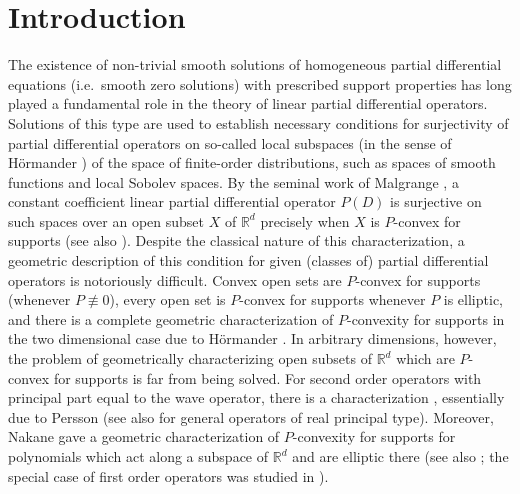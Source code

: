 \documentclass[a4paper,10pt]{amsart}
\newtheorem*{crucial lemma}{Lemma \ref{lem:nice polynomial2}}
\theoremstyle{definition}
\newcommand{\R}{\mathbb{R}}
\begin{document}
\section{Introduction}\label{section:introduction}

The existence of non-trivial smooth solutions of homogeneous partial differential equations (i.e.~smooth zero solutions) with prescribed support properties has long played a fundamental role in the theory of linear partial differential operators. Solutions of this type are used to establish necessary conditions for surjectivity of partial differential operators on so-called local subspaces (in the sense of H\"ormander \cite[Chapter 10]{Hor2}) of the space of finite-order distributions, such as spaces of smooth functions and local Sobolev spaces. By the seminal work of Malgrange \cite{Malgrange1955}, a constant coefficient linear partial differential operator $P(D)$ is surjective on such spaces over an open subset $X$ of $\R^d$ precisely when $X$ is $P$-convex for supports (see also \cite[Section 10.6]{Hor2}). Despite the classical nature of this characterization, a geometric description of this condition for given (classes of) partial differential operators is notoriously difficult. Convex open sets are $P$-convex for supports \cite{Malgrange1955} (whenever $P\not\equiv 0$), every open set is $P$-convex for supports whenever $P$ is elliptic, and there is a complete geometric characterization of $P$-convexity for supports in the two dimensional case due to H\"ormander \cite[Theorem 10.8.3]{Hor2}. In arbitrary dimensions, however, the problem of geometrically characterizing open subsets of $\R^d$ which are $P$-convex for supports is far from being solved. For second order operators with principal part equal to the wave operator, there is a characterization \cite[Theorem 10.8.6]{Hor2}, essentially due to Persson \cite{Persson1981} (see also \cite{Persson1993,Tintarev1992,Tintarev1988} for general operators of real principal type). Moreover, Nakane \cite{Nakane1979} gave a geometric characterization of $P$-convexity for supports for polynomials which act along a subspace of $\R^d$ and are elliptic there (see also \cite[Theorem 10.8.5]{Hor2}; the special case of first order operators was studied in \cite{Zachmanoglou69}).
\end{document}
